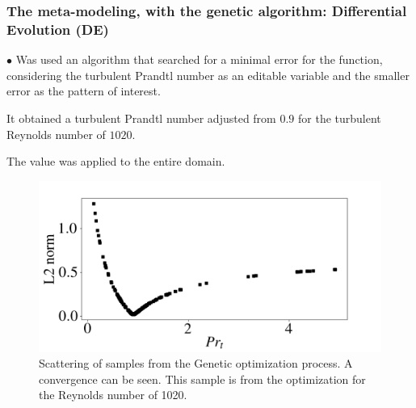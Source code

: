 \documentclass[xcolor=dvipsnames,8pt,aspectratio=34]{beamer}
\begin{document}
	
		\begin{frame}
		\frametitle{The meta-modeling, with the genetic algorithm: Differential Evolution (DE)}
		\begin{minipage}[h!]{0.35\textwidth}
			$\bullet$ Was used an algorithm that searched for a minimal error for the function, considering the turbulent Prandtl number as an editable variable and the smaller error as the pattern of interest.
			
			It obtained a turbulent Prandtl number adjusted from $ 0.9 $ for the turbulent Reynolds number of $ 1020$.
			
			The value was applied to the entire domain.
		\end{minipage}
			\begin{minipage}[h!]{0.3\textwidth}
			\end{minipage}
			\begin{minipage}[h!]{0.55\textwidth}
			\begin{figure}
				\centering
				\includegraphics[angle=0, scale=0.3]{fotos_formatacao_final/Genetic_amostra}
				\caption{Scattering of samples from the Genetic optimization process. A convergence can be seen. This sample is from the optimization for the Reynolds number of 1020.}
			\end{figure}
		\end{minipage}	
		\end{frame}
		
		
		
		
		
\end{document}
